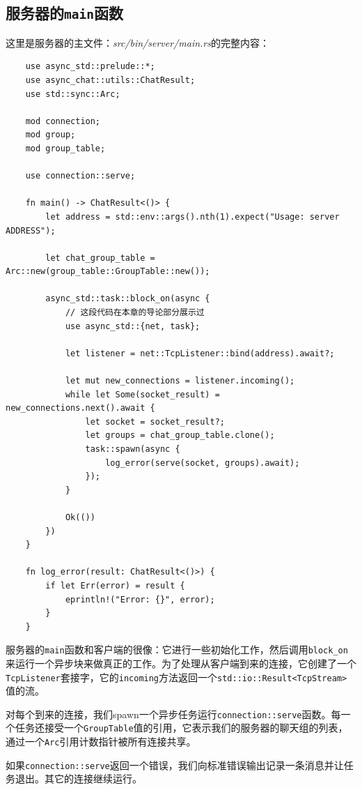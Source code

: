\subsection{服务器的\texttt{main}函数}
这里是服务器的主文件：\emph{src/bin/server/main.rs}的完整内容：
\begin{verbatim}
    use async_std::prelude::*;
    use async_chat::utils::ChatResult;
    use std::sync::Arc;

    mod connection;
    mod group;
    mod group_table;

    use connection::serve;

    fn main() -> ChatResult<()> {
        let address = std::env::args().nth(1).expect("Usage: server ADDRESS");

        let chat_group_table = Arc::new(group_table::GroupTable::new());

        async_std::task::block_on(async {
            // 这段代码在本章的导论部分展示过
            use async_std::{net, task};
            
            let listener = net::TcpListener::bind(address).await?;

            let mut new_connections = listener.incoming();
            while let Some(socket_result) = new_connections.next().await {
                let socket = socket_result?;
                let groups = chat_group_table.clone();
                task::spawn(async {
                    log_error(serve(socket, groups).await);
                });
            }

            Ok(())
        })
    }

    fn log_error(result: ChatResult<()>) {
        if let Err(error) = result {
            eprintln!("Error: {}", error);
        }
    }
\end{verbatim}

服务器的\texttt{main}函数和客户端的很像：它进行一些初始化工作，然后调用\texttt{block\_on}来运行一个异步块来做真正的工作。为了处理从客户端到来的连接，它创建了一个\texttt{TcpListener}套接字，它的\texttt{incoming}方法返回一个\texttt{std::io::Result<TcpStream>}值的流。

对每个到来的连接，我们spawn一个异步任务运行\texttt{connection::serve}函数。每一个任务还接受一个\texttt{GroupTable}值的引用，它表示我们的服务器的聊天组的列表，通过一个\texttt{Arc}引用计数指针被所有连接共享。

如果\texttt{connection::serve}返回一个错误，我们向标准错误输出记录一条消息并让任务退出。其它的连接继续运行。

